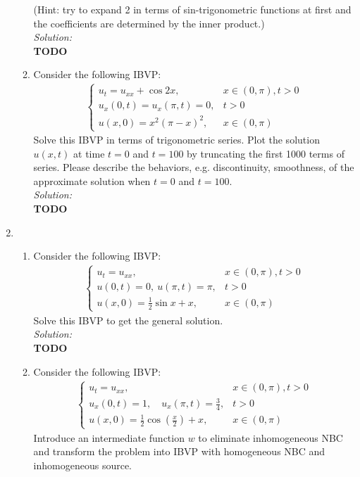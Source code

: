 \documentclass[10pt]{amsart}
\theoremstyle{nonumberplain}
\begin{document}
\begin{enumerate}[label={\bf {\arabic*}:}]
\begin{enumerate}
(Hint: try to expand 2 in terms of sin-trigonometric functions at first and the coefficients are determined by the inner product.) \\

\noindent
\textit{Solution:} \\
\textbf{TODO} \\

\newpage


\item Consider the following IBVP:
\begin{align*}
\begin{cases}
u_t = u_{xx} + \cos 2x, &x \in (0, \pi), t > 0 \\
u_x(0, t) = u_x(\pi, t) = 0, & t > 0 \\
u(x, 0) = x^2(\pi - x)^2, &x \in (0, \pi)
\end{cases}
\end{align*}
Solve this IBVP in terms of trigonometric series.
Plot the solution $u(x, t)$ at time $t=0$ and $t=100$ by truncating the first 1000 terms of series.
Please describe the behaviors, e.g. discontinuity, smoothness, of the approximate solution when $t=0$ and $t=100$. \\

\noindent
\textit{Solution:} \\
\textbf{TODO} \\

\end{enumerate}

\newpage

\item
\begin{enumerate}
\item Consider the following IBVP:
\begin{align*}
\begin{cases}
u_t = u_{xx}, &x \in (0, \pi), t > 0 \\
u(0, t) = 0, \: u(\pi, t) = \pi, & t > 0 \\
u(x, 0) = \frac 1 2 \sin x + x, &x \in (0, \pi)
\end{cases}
\end{align*}
Solve this IBVP to get the general solution. \\

\noindent
\textit{Solution:} \\
\textbf{TODO} \\
\newpage


\item Consider the following IBVP:
\begin{align*}
\begin{cases}
u_t = u_{xx}, &x \in (0, \pi), t > 0 \\
u_x(0, t) = 1, \quad u_x(\pi, t) = \frac 3 4, & t > 0 \\
u(x, 0) = \frac 1 2 \cos \left( \frac x 2 \right) + x, &x \in (0, \pi)
\end{cases}
\end{align*}
Introduce an intermediate function $w$ to eliminate inhomogeneous NBC and transform the problem into IBVP with homogeneous NBC and inhomogeneous source. \\


\end{enumerate}
\end{enumerate}
\end{document}
